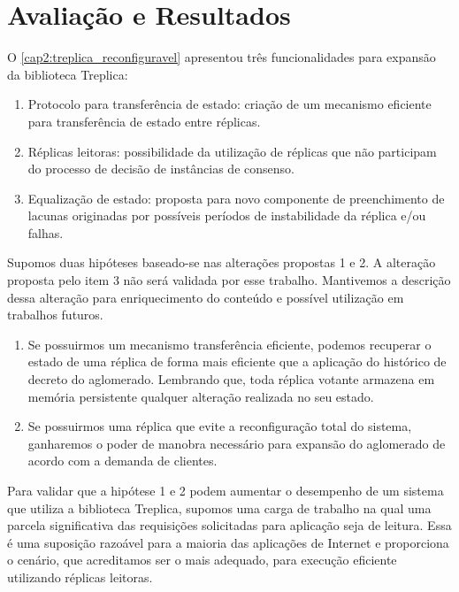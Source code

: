 \chapter{Avaliação e Resultados}\label{cap3}

O \autoref{cap2:treplica_reconfiguravel} apresentou três funcionalidades para expansão da
biblioteca Treplica:

\begin{enumerate}
  \item Protocolo para transferência de estado: criação de um mecanismo eficiente para
    transferência de estado entre réplicas.
  \item Réplicas leitoras: possibilidade da utilização de réplicas que não participam do
    processo de decisão de instâncias de consenso.
  \item Equalização de estado: proposta para novo componente de preenchimento de lacunas
    originadas por possíveis períodos de instabilidade da réplica e/ou falhas.
\end{enumerate}

Supomos duas hipóteses baseado-se nas alterações propostas 1 e 2. A alteração proposta
pelo item 3 não será validada por esse trabalho. Mantivemos a descrição dessa alteração
para enriquecimento do conteúdo e possível utilização em trabalhos futuros.

\begin{enumerate}
  \item Se possuirmos um mecanismo transferência eficiente, podemos recuperar o estado de
    uma réplica de forma mais eficiente que a aplicação do histórico de decreto do
    aglomerado. Lembrando que, toda réplica votante armazena em memória persistente
    qualquer alteração realizada no seu estado.
  \item Se possuirmos uma réplica que evite a reconfiguração total do sistema, ganharemos
    o poder de manobra necessário para expansão do aglomerado de acordo com a demanda de
    clientes.
\end{enumerate}

Para validar que a hipótese 1 e 2 podem aumentar o desempenho de um sistema que utiliza a
biblioteca Treplica, supomos uma carga de trabalho na qual uma parcela significativa das
requisições solicitadas para aplicação seja de leitura. Essa é uma suposição razoável para
a maioria das aplicações de Internet \cite{tpc02} e proporciona o cenário, que acreditamos
ser o mais adequado, para execução eficiente utilizando réplicas leitoras.

